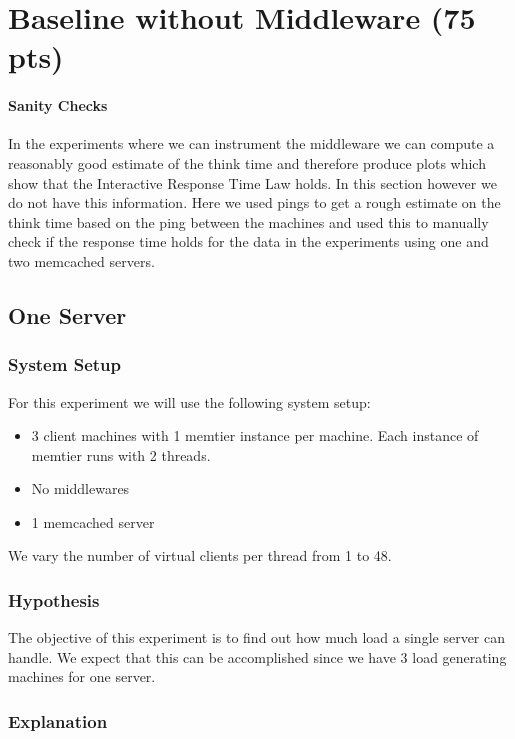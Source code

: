 \documentclass[11pt,a4paper]{article}
\begin{document}
\section{Baseline without Middleware (75 pts)}
%
\paragraph{Sanity Checks}
%
In the experiments where we can instrument the middleware we can compute a reasonably good estimate of the think time and therefore produce plots which show that the Interactive Response Time Law holds.
%
In this section however we do not have this information.
%
Here we used pings to get a rough estimate on the think time based on the ping between the machines and used this to manually check if the response time holds for the data in the experiments using one and two memcached servers.
%
\subsection{One Server}
%
\subsubsection{System Setup}
%
For this experiment we will use the following system setup:
%
\begin{itemize}
	\item 3 client machines with 1 memtier instance per machine. Each instance of memtier runs with 2 threads.
	\item No middlewares
	\item 1 memcached server
\end{itemize}
%
We vary the number of virtual clients per thread from 1 to 48.
%
\subsubsection{Hypothesis}
%
The objective of this experiment is to find out how much load a single server can handle.
%
We expect that this can be accomplished since we have 3 load generating machines for one server.
%
\subsubsection{Explanation}\label{sec:one_server_explanantion}
%
\end{document}
